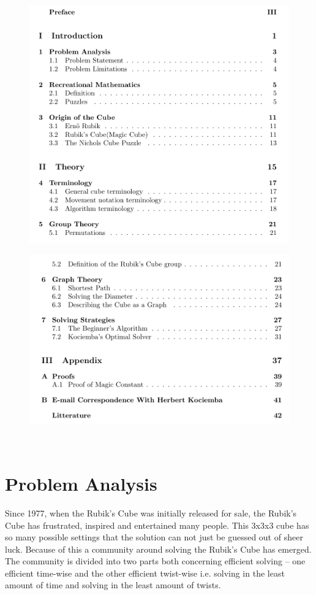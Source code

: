 \documentclass{article}
\begin{document}
\begin{figure}[hp]
	\centering
		\includegraphics[scale = 0.7]{toc1.pdf}
		
		\label{fig:toc1}
\end{figure}
\begin{figure}
	\centering
		\includegraphics[scale = 0.7]{toc2.pdf}
	
	\label{fig:toc2}
\end{figure}




\ \pagebreak{}

\section{Problem Analysis}
Since 1977, when the Rubik's Cube was initially released for sale, the Rubik's Cube has frustrated, inspired and entertained many people. This 3x3x3 cube has so many possible settings that the solution can not just be guessed out of sheer luck. Because of this a community around solving the Rubik's Cube has emerged. The community is divided into two parts both concerning efficient solving -- one efficient time-wise and the other efficient twist-wise i.e. solving in the least amount of time and solving in the least amount of twists. 
\end{document}
